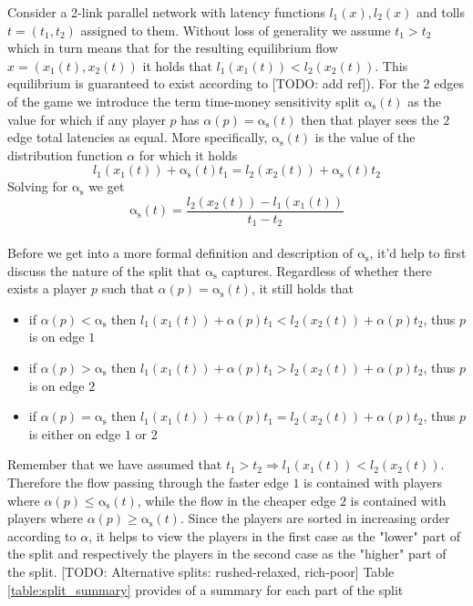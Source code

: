 \documentclass[10pt,a4paper]{book}
\newcommand{\as}{\mathrm{\alpha_s}}
\theoremstyle{definition}
\theoremstyle{comment}
\begin{document}
Consider a 2-link parallel network with latency functions $l_1(x), l_2(x)$ and tolls $t=(t_1, t_2)$ assigned to them.
Without loss of generality we assume $t_1 > t_2$ which in turn means that for the resulting equilibrium flow $x = (x_1(t), x_2(t))$ it holds that $l_1(x_1(t)) < l_2(x_2(t))$.
This equilibrium is guaranteed to exist according to [TODO: add ref]).
For the 2 edges of the game we introduce the term time-money sensitivity split $\as(t)$ as the value for which if any player $p$ has $\alpha(p)=\as(t)$ then that player sees the $2$ edge total latencies as equal.
More specifically, $\as(t)$ is the value of the distribution function $\alpha$ for which it holds
\[l_1(x_1(t)) + \as(t) t_1 = l_2(x_2(t)) + \as(t) t_2\]
Solving for $\as$ we get
\[\as(t) = \frac{l_2(x_2(t)) - l_1(x_1(t))}{t_1 - t_2}\]
\\
Before we get into a more formal definition and description of $\as$, it'd help to first discuss the nature of the split that $\as$ captures.
Regardless of whether there exists a player $p$ such that $\alpha(p) = \as(t)$, it still holds that
\begin{itemize}
	\item if $\alpha(p) < \as$ then $l_1(x_1(t)) + \alpha(p) t_1 < l_2(x_2(t)) + \alpha(p) t_2$, thus $p$ is on edge $1$
	\item if $\alpha(p) > \as$ then $l_1(x_1(t)) + \alpha(p) t_1 > l_2(x_2(t)) + \alpha(p) t_2$, thus $p$ is on edge $2$
	\item if $\alpha(p) = \as$ then $l_1(x_1(t)) + \alpha(p) t_1 = l_2(x_2(t)) + \alpha(p) t_2$, thus $p$ is either on edge $1$ or $2$
\end{itemize}
Remember that we have assumed that $t_1 > t_2 \Rightarrow l_1(x_1(t)) < l_2(x_2(t))$.
Therefore the flow passing through the faster edge $1$ is contained with players where $\alpha(p) \le \as(t)$, while the flow in the cheaper edge $2$ is contained with players where $\alpha(p) \ge \as(t)$.
Since the players are sorted in increasing order according to $\alpha$, it helps to view the players in the first case as the "lower" part of the split and respectively the players in the second case as the "higher" part of the split.
[TODO: Alternative splits: rushed-relaxed, rich-poor]
Table \autoref{table:split_summary} provides of a summary for each part of the split
\end{document}
